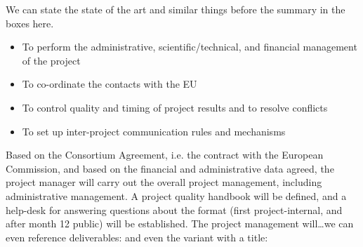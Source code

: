 \begin{workpackage}[id=management,type=MGT,wphases=0-24!.2,
  title=Project Management,short=Management,
  jacuRM=2,barRM=2,efoRM=2,bazRM=2]
We can state the state of the art and similar things before the summary in the boxes
here. 
\wpheadertable
\begin{wpobjectives}
  \begin{itemize}
    \item To perform the administrative, scientific/technical, and financial
      management of the project
    \item To co-ordinate the contacts with the EU
    \item To control quality and timing of project results and to resolve conflicts
    \item To set up inter-project communication rules and mechanisms
  \end{itemize}
\end{wpobjectives}

\begin{wpdescription}
  Based on the Consortium Agreement, i.e. the contract with the European Commission, and
  based on the financial and administrative data agreed, the project manager will carry
  out the overall project management, including administrative management.  A project
  quality handbook will be defined, and a {\pn} help-desk for answering questions about
  the format (first project-internal, and after month 12 public) will be established. The
  project management will\ldots we can even reference deliverables:
   and even the variant with a title:
\end{wpdescription}


\end{workpackage}
